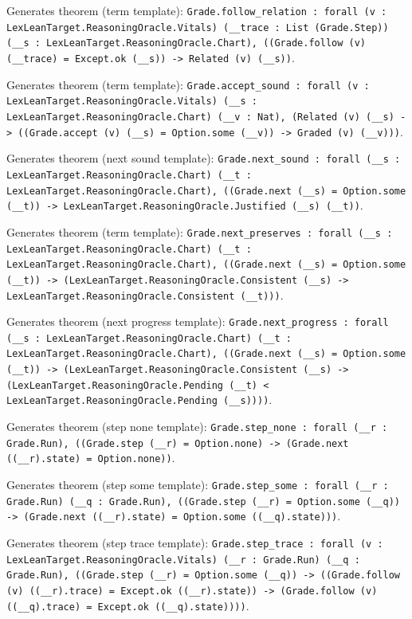 \documentclass[11pt]{article}
\begin{document}
\noindent Generates theorem (term template): \texttt{Grade.follow\_relation : forall (v : LexLeanTarget.ReasoningOracle.Vitals) (\_\_trace : List (Grade.Step)) (\_\_s : LexLeanTarget.ReasoningOracle.Chart), ((Grade.follow (v) (\_\_trace) = Except.ok (\_\_s)) -> Related (v) (\_\_s))}.\par
\noindent Generates theorem (term template): \texttt{Grade.accept\_sound : forall (v : LexLeanTarget.ReasoningOracle.Vitals) (\_\_s : LexLeanTarget.ReasoningOracle.Chart) (\_\_v : Nat), (Related (v) (\_\_s) -> ((Grade.accept (v) (\_\_s) = Option.some (\_\_v)) -> Graded (v) (\_\_v)))}.\par
\noindent Generates theorem (next sound template): \texttt{Grade.next\_sound : forall (\_\_s : LexLeanTarget.ReasoningOracle.Chart) (\_\_t : LexLeanTarget.ReasoningOracle.Chart), ((Grade.next (\_\_s) = Option.some (\_\_t)) -> LexLeanTarget.ReasoningOracle.Justified (\_\_s) (\_\_t))}.\par
\noindent Generates theorem (term template): \texttt{Grade.next\_preserves : forall (\_\_s : LexLeanTarget.ReasoningOracle.Chart) (\_\_t : LexLeanTarget.ReasoningOracle.Chart), ((Grade.next (\_\_s) = Option.some (\_\_t)) -> (LexLeanTarget.ReasoningOracle.Consistent (\_\_s) -> LexLeanTarget.ReasoningOracle.Consistent (\_\_t)))}.\par
\noindent Generates theorem (next progress template): \texttt{Grade.next\_progress : forall (\_\_s : LexLeanTarget.ReasoningOracle.Chart) (\_\_t : LexLeanTarget.ReasoningOracle.Chart), ((Grade.next (\_\_s) = Option.some (\_\_t)) -> (LexLeanTarget.ReasoningOracle.Consistent (\_\_s) -> (LexLeanTarget.ReasoningOracle.Pending (\_\_t) < LexLeanTarget.ReasoningOracle.Pending (\_\_s))))}.\par
\noindent Generates theorem (step none template): \texttt{Grade.step\_none : forall (\_\_r : Grade.Run), ((Grade.step (\_\_r) = Option.none) -> (Grade.next ((\_\_r).state) = Option.none))}.\par
\noindent Generates theorem (step some template): \texttt{Grade.step\_some : forall (\_\_r : Grade.Run) (\_\_q : Grade.Run), ((Grade.step (\_\_r) = Option.some (\_\_q)) -> (Grade.next ((\_\_r).state) = Option.some ((\_\_q).state)))}.\par
\noindent Generates theorem (step trace template): \texttt{Grade.step\_trace : forall (v : LexLeanTarget.ReasoningOracle.Vitals) (\_\_r : Grade.Run) (\_\_q : Grade.Run), ((Grade.step (\_\_r) = Option.some (\_\_q)) -> ((Grade.follow (v) ((\_\_r).trace) = Except.ok ((\_\_r).state)) -> (Grade.follow (v) ((\_\_q).trace) = Except.ok ((\_\_q).state))))}.\par
\end{document}
